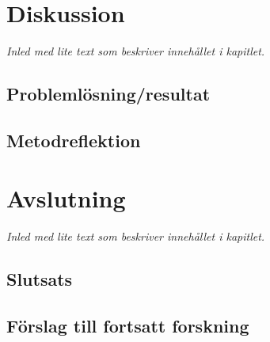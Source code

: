 \documentclass[a4paper,12pt]{article}
\newcommand{\Section}[1]{\section{#1}\vspace{-8pt}}
\newcommand{\Subsection}[1]{\vspace{-4pt}\subsection{#1}\vspace{-8pt}}
\begin{document}
\newpage
	
	\Section{Diskussion}
		\emph{Inled med lite text som beskriver inneh\aa llet i kapitlet.}

		\Subsection{Problemlösning/resultat}

		\Subsection{Metodreflektion}

\newpage
		
	\Section{Avslutning}
		\emph{Inled med lite text som beskriver inneh\aa llet i kapitlet.}
		
		\Subsection{Slutsats}

		\Subsection{Förslag till fortsatt forskning}
\newpage

	
	\newpage
	\clearpage
	
	
	\newpage
	
%	
%	
%	
%	
\end{document}
